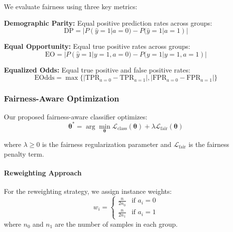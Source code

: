 We evaluate fairness using three key metrics:

\textbf{Demographic Parity:} Equal positive prediction rates across groups:
\begin{equation}
\text{DP} = |P(\hat{y} = 1 | a = 0) - P(\hat{y} = 1 | a = 1)| \label{eq:demographic_parity}
\end{equation}

\textbf{Equal Opportunity:} Equal true positive rates across groups:
\begin{equation}
\text{EO} = |P(\hat{y} = 1 | y = 1, a = 0) - P(\hat{y} = 1 | y = 1, a = 1)| \label{eq:equal_opportunity}
\end{equation}

\textbf{Equalized Odds:} Equal true positive and false positive rates:
\begin{equation}
\text{EOdds} = \max\{|\text{TPR}_{a=0} - \text{TPR}_{a=1}|, |\text{FPR}_{a=0} - \text{FPR}_{a=1}|\} \label{eq:equalized_odds}
\end{equation}

\subsubsection{Fairness-Aware Optimization}

Our proposed fairness-aware classifier optimizes:
\begin{equation}
\boldsymbol{\theta}^* = \arg\min_{\boldsymbol{\theta}} \mathcal{L}_{\text{class}}(\boldsymbol{\theta}) + \lambda \mathcal{L}_{\text{fair}}(\boldsymbol{\theta}) \label{eq:fairness_optimization}
\end{equation}

where $\lambda \geq 0$ is the fairness regularization parameter and $\mathcal{L}_{\text{fair}}$ is the fairness penalty term.

\paragraph{Reweighting Approach}

For the reweighting strategy, we assign instance weights:
\begin{equation}
w_i = \begin{cases}
\frac{n}{2n_0} & \text{if } a_i = 0 \\
\frac{n}{2n_1} & \text{if } a_i = 1
\end{cases} \label{eq:reweighting}
\end{equation}
where $n_0$ and $n_1$ are the number of samples in each group.

